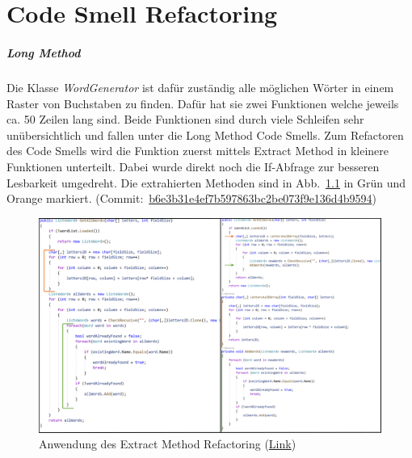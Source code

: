 \chapter{Code Smell Refactoring}

\paragraph{Long Method}


Die Klasse \textit{WordGenerator} ist dafür zuständig alle möglichen Wörter in einem Raster von Buchstaben zu finden. Dafür hat sie zwei Funktionen welche jeweils ca. 50 Zeilen lang sind. Beide Funktionen sind durch viele Schleifen sehr unübersichtlich und fallen unter die Long Method Code Smells. Zum Refactoren des Code Smells wird die Funktion zuerst mittels Extract Method in kleinere Funktionen unterteilt. Dabei wurde direkt noch die If-Abfrage zur besseren Lesbarkeit umgedreht. Die extrahierten Methoden sind in Abb.~\ref{Abb:ExtractMethod} in Grün und Orange markiert. (Commit:~\href{https://github.com/EinToni/Wortfinder/commit/b6e3b31e4ef7b597863bc2be073f9e136d4b9594}{b6e3b31e4ef7b597863bc2be073f9e136d4b9594})

\begin{figure}[!ht]
  \centering
  \includegraphics[width=\textwidth]{Bilder/ExtractMethod.PNG}
  \caption[Anwendung des Extract Method Refactoring]{Anwendung des Extract Method Refactoring (\href{https://github.com/EinToni/WortfinderDoku/blob/main/Bilder/ExtractMethod.png}{Link})}
  \label{Abb:ExtractMethod}
\end{figure}

